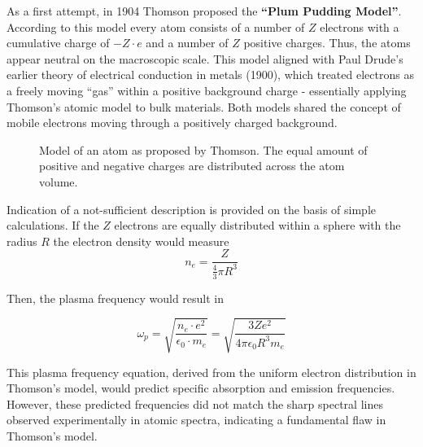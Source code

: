 \documentclass[
  a4paper,
]{book}
\begin{document}
As a first attempt, in 1904 Thomson proposed the \textbf{``Plum Pudding
Model''}. According to this model every atom consists of a number of
\(Z\) electrons with a cumulative charge of \(-Z\cdot e\) and a number
of \(Z\) positive charges. Thus, the atoms appear neutral on the
macroscopic scale. This model aligned with Paul Drude's earlier theory
of electrical conduction in metals (1900), which treated electrons as a
freely moving ``gas'' within a positive background charge - essentially
applying Thomson's atomic model to bulk materials. Both models shared
the concept of mobile electrons moving through a positively charged
background.

\begin{figure}


\caption{\label{fig-thomson}Model of an atom as proposed by Thomson. The
equal amount of positive and negative charges are distributed across the
atom volume.}

\end{figure}%

Indication of a not-sufficient description is provided on the basis of
simple calculations. If the \(Z\) electrons are equally distributed
within a sphere with the radius \(R\) the electron density would measure
\[
n_e = \frac{Z}{\frac{4}{3}\pi R^3}
\]

Then, the plasma frequency would result in

\[
\omega_p = \sqrt{\frac{n_e \cdot e^2}{\epsilon_0 \cdot m_e}} = \sqrt{\frac{3 Z e^2}{4 \pi \epsilon_0 R^3 m_e}}
\]

This plasma frequency equation, derived from the uniform electron
distribution in Thomson's model, would predict specific absorption and
emission frequencies. However, these predicted frequencies did not match
the sharp spectral lines observed experimentally in atomic spectra,
indicating a fundamental flaw in Thomson's model.
\end{document}
